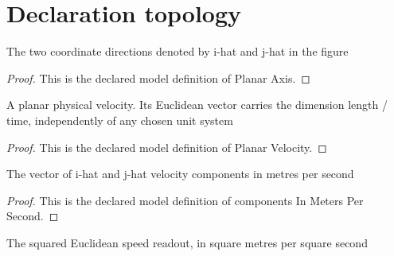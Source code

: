 \section{Declaration topology}
\begin{definition}
  \label{def:physics:phyx-mini-0377:phyxminiproblems-problemphyxmini0377-planaraxis}
  The two coordinate directions denoted by i-hat and j-hat in the figure
\end{definition}
\begin{proof}
  This is the declared model definition of Planar Axis.
\end{proof}
\begin{definition}
  \label{def:physics:phyx-mini-0377:phyxminiproblems-problemphyxmini0377-planarvelocity}
  A planar physical velocity. Its Euclidean vector carries the dimension length / time, independently of any chosen unit system
\end{definition}
\begin{proof}
  This is the declared model definition of Planar Velocity.
\end{proof}
\begin{definition}
  \label{def:physics:phyx-mini-0377:phyxminiproblems-problemphyxmini0377-componentsinmeterspersecond}
  The vector of i-hat and j-hat velocity components in metres per second
\end{definition}
\begin{proof}
  This is the declared model definition of components In Meters Per Second.
\end{proof}
\begin{definition}
  \label{def:physics:phyx-mini-0377:phyxminiproblems-problemphyxmini0377-speedsquaredinmeterssquaredpersecondsquared}
  The squared Euclidean speed readout, in square metres per square second
\end{definition}
